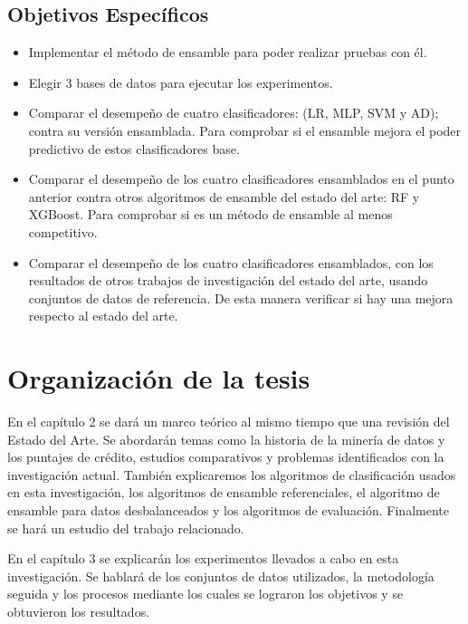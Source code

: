 \subsection{Objetivos Específicos}

\begin{itemize}
	\item Implementar el método de ensamble para poder realizar pruebas con él.

	\item Elegir 3 bases de datos para ejecutar los experimentos.

	\item Comparar el desempeño de cuatro clasificadores: (\ac{LR}, \ac{MLP}, \ac{SVM} y \ac{AD}); contra su versión ensamblada. Para comprobar si el ensamble mejora el poder predictivo de estos clasificadores base.

	\item Comparar el desempeño de los cuatro clasificadores ensamblados en el punto anterior contra otros algoritmos de ensamble del estado del arte: \ac{RF} y \ac{XGBoost}. Para comprobar si es un método de ensamble al menos competitivo.

	\item Comparar el desempeño de los cuatro clasificadores ensamblados, con los resultados de otros trabajos de investigación del estado del arte, usando conjuntos de datos de referencia. De esta manera verificar si hay una mejora respecto al estado del arte.
\end{itemize}

\section{Organización de la tesis}

En el capítulo 2 se dará un marco teórico al mismo tiempo que una revisión del Estado del Arte. Se abordarán temas como la historia de la minería de datos y los puntajes de crédito, estudios comparativos y problemas identificados con la investigación actual. También explicaremos los algoritmos de clasificación usados en esta investigación, los algoritmos de ensamble referenciales, el algoritmo de ensamble para datos desbalanceados y los algoritmos de evaluación. Finalmente se hará un estudio del trabajo relacionado.

En el capítulo 3 se explicarán los experimentos llevados a cabo en esta investigación. Se hablará de los conjuntos de datos utilizados, la metodología seguida y los procesos mediante los cuales se lograron los objetivos y se obtuvieron los resultados.

